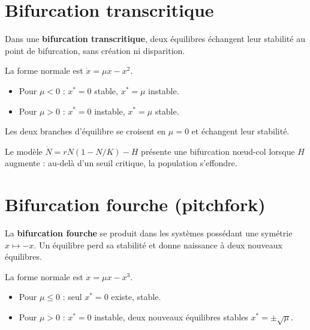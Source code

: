 \section{Bifurcation transcritique}

\begin{definition}
Dans une \textbf{bifurcation transcritique}, deux \'equilibres \'echangent
leur stabilit\'e au point de bifurcation, sans cr\'eation ni disparition.
\end{definition}

\begin{theoreme}
La forme normale est $\dot{x} = \mu x - x^2$.
\begin{itemize}
    \item Pour $\mu < 0$ : $x^* = 0$ stable, $x^* = \mu$ instable.
    \item Pour $\mu > 0$ : $x^* = 0$ instable, $x^* = \mu$ stable.
\end{itemize}
Les deux branches d'\'equilibre se croisent en $\mu = 0$ et \'echangent
leur stabilit\'e.
\end{theoreme}

\begin{exemple}
Le mod\`ele $\dot{N} = rN(1 - N/K) - H$ pr\'esente une bifurcation
n\oe ud-col lorsque $H$ augmente : au-del\`a d'un seuil critique, la
population s'effondre.
\end{exemple}

\section{Bifurcation fourche (pitchfork)}

\begin{definition}
La \textbf{bifurcation fourche} se produit dans les syst\`emes poss\'edant
une sym\'etrie $x \mapsto -x$. Un \'equilibre perd sa stabilit\'e et donne
naissance \`a deux nouveaux \'equilibres.
\end{definition}

\begin{theoreme}
La forme normale est $\dot{x} = \mu x - x^3$.
\begin{itemize}
    \item Pour $\mu \leq 0$ : seul $x^* = 0$ existe, stable.
    \item Pour $\mu > 0$ : $x^* = 0$ instable, deux nouveaux \'equilibres
    stables $x^* = \pm\sqrt{\mu}$.
\end{itemize}
\end{theoreme}

